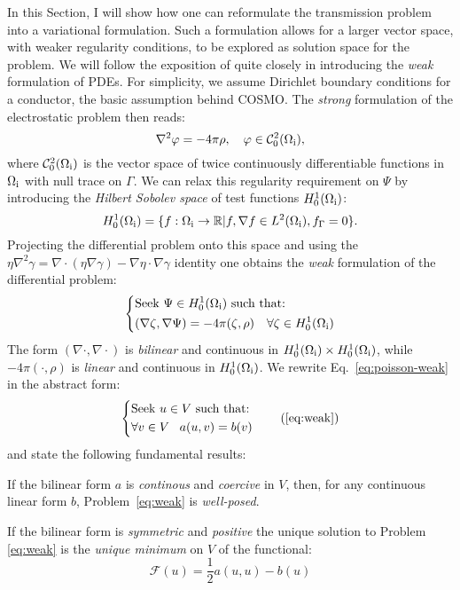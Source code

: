 In this Section, I will show how one can reformulate the transmission problem
into a variational formulation.
Such a formulation allows for a larger vector space, with weaker regularity
conditions, to be explored as solution space for the problem.
We will follow the exposition of \citeauthor{Ern2004-oo} quite closely
in introducing the \emph{weak} formulation of \glspl{PDE}.
For simplicity, we assume Dirichlet boundary conditions for a conductor,
\ie the basic assumption behind \acrshort{COSMO}.
The \emph{strong} formulation of the electrostatic problem then reads:
\begin{equation}\label{eq:poisson-cosmo}
  \nabla^2\varphi = -4\pi\rho,
  \quad \varphi \in \mathcal{C}^2_0(\Omega_\mathrm{i}),
\end{equation}
where $\mathcal{C}^2_0(\Omega_\mathrm{i})$ is the vector space of twice
continuously differentiable functions in $\Omega_\mathrm{i}$ with null trace on
$\Gamma$.
We can relax this regularity requirement on $\Psi$ by introducing the
\emph{Hilbert Sobolev space} of test functions $H_0^1(\Omega_\mathrm{i})$:
\begin{equation}
  H_0^1(\Omega_\mathrm{i}) = \lbrace
  f : \Omega_\mathrm{i} \rightarrow \mathbb{R}
  | f, \nabla f \in L^2(\Omega_\mathrm{i}), f_\Gamma = 0
  \rbrace.
\end{equation}
Projecting the differential problem onto this space and using the
$\eta\nabla^2\gamma = \nabla\cdot(\eta\nabla\gamma) - \nabla\eta\cdot\nabla\gamma$ identity
one obtains the \emph{weak} formulation of the differential problem:
\begin{equation}\label{eq:poisson-weak}
  \left\{
  \begin{aligned}
    &\text{Seek $\Psi \in H_0^1(\Omega_\mathrm{i})$ such that:}\\
    &(\nabla\zeta, \nabla\Psi) =
    -4\pi(\zeta, \rho) \quad
    \forall \zeta\in H_0^1(\Omega_\mathrm{i})
  \end{aligned}
  \right.
\end{equation}
The form $(\nabla\cdot, \nabla\cdot)$ is \emph{bilinear} and continuous
in $H_0^1(\Omega_\mathrm{i})\times H_0^1(\Omega_\mathrm{i})$, while $-4\pi(\cdot, \rho)$ is
\emph{linear} and continuous in $H_0^1(\Omega_\mathrm{i})$.
We rewrite Eq.~\eqref{eq:poisson-weak} in the abstract form:
\begin{equation}
  \left\{
  \begin{aligned}
    &\text{Seek $u \in V$ such that:}\\
    &\forall v \in V \,\,\,\,\,
    a(u, v) = b(v)
  \end{aligned}
  \right.
  \tag{\ref{eq:weak}}
\end{equation}
and state the following fundamental results:
\begin{lemma}
  If the bilinear form $a$ is \emph{continous} and \emph{coercive}
  in $V$, then, for any continuous linear form $b$, Problem~\eqref{eq:weak} is
  \emph{well-posed}.
\end{lemma}
\begin{corollary}
  If the bilinear form is \emph{symmetric} and \emph{positive}
  the unique solution to Problem \eqref{eq:weak} is
  the \emph{unique minimum} on $V$ of the functional:
  \[
  \mathcal{F}(u) = \frac{1}{2}a(u, u) - b(u)
  \]
\end{corollary}

